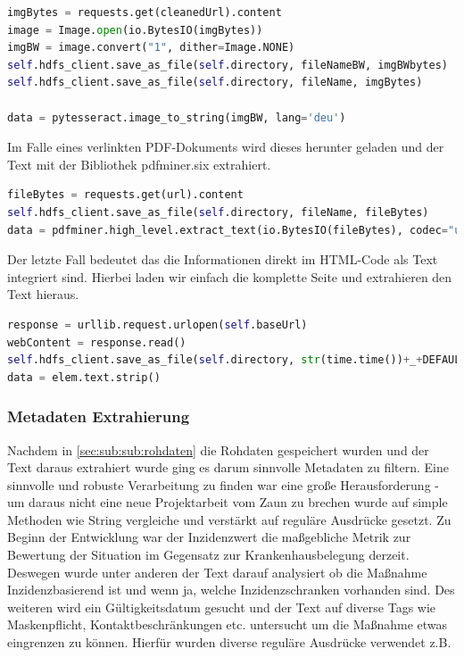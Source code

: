 \documentclass[12pt,oneside,a4paper,parskip]{scrbook}
\begin{document}
\begin{lstlisting}[basicstyle=\small, caption=Schwarz-weiß Konvertierung, language=Python]
imgBytes = requests.get(cleanedUrl).content
image = Image.open(io.BytesIO(imgBytes))
imgBW = image.convert("1", dither=Image.NONE)
self.hdfs_client.save_as_file(self.directory, fileNameBW, imgBWbytes)
self.hdfs_client.save_as_file(self.directory, fileName, imgBytes)

data = pytesseract.image_to_string(imgBW, lang='deu')
\end{lstlisting}

Im Falle eines verlinkten PDF-Dokuments wird dieses herunter geladen und der Text mit der Bibliothek pdfminer.six extrahiert.

\begin{lstlisting}[basicstyle=\small, caption=PDF Text Extraktion, language=Python]
fileBytes = requests.get(url).content
self.hdfs_client.save_as_file(self.directory, fileName, fileBytes)
data = pdfminer.high_level.extract_text(io.BytesIO(fileBytes), codec="utf-8")
\end{lstlisting}

\pagebreak
Der letzte Fall bedeutet das die Informationen direkt im HTML-Code als Text integriert sind. Hierbei laden wir einfach die komplette Seite und extrahieren den Text hieraus.

\begin{lstlisting}[basicstyle=\small, caption=Website speichern, language=Python]
response = urllib.request.urlopen(self.baseUrl)
webContent = response.read()
self.hdfs_client.save_as_file(self.directory, str(time.time())+_+DEFAULT_HTML_FILENAME, webContent)
data = elem.text.strip()
\end{lstlisting}

\subsubsection{Metadaten Extrahierung}

Nachdem in \cref{sec:sub:sub:rohdaten} die Rohdaten gespeichert wurden und der Text daraus extrahiert wurde ging es darum sinnvolle Metadaten zu filtern. Eine sinnvolle und robuste Verarbeitung zu finden war eine große Herausforderung - um daraus nicht eine neue Projektarbeit vom Zaun zu brechen wurde auf simple Methoden wie String vergleiche und verstärkt auf reguläre Ausdrücke gesetzt. Zu Beginn der Entwicklung war der Inzidenzwert die maßgebliche Metrik zur Bewertung der Situation im Gegensatz zur Krankenhausbelegung derzeit. Deswegen wurde unter anderen der Text darauf analysiert ob die Maßnahme Inzidenzbasierend ist und wenn ja, welche Inzidenzschranken vorhanden sind. Des weiteren wird ein Gültigkeitsdatum gesucht und der Text auf diverse Tags wie Maskenpflicht, Kontaktbeschränkungen etc. untersucht um die Maßnahme etwas eingrenzen zu können. Hierfür wurden diverse reguläre Ausdrücke verwendet z.B.
\end{document}
